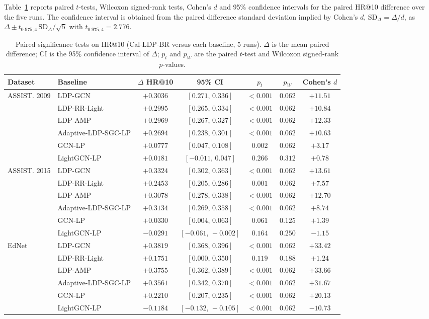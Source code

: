 Table~\ref{tab:sig} reports paired $t$-tests, Wilcoxon signed-rank tests, Cohen's $d$ and 95\% confidence intervals for the paired HR@10 difference over the five runs. The confidence interval is obtained from the paired difference standard deviation implied by Cohen's $d$, $\mathrm{SD}_{\Delta}=\Delta/d$, as $\Delta\pm t_{0.975,4}\,\mathrm{SD}_{\Delta}/\sqrt{5}$ with $t_{0.975,4}=2.776$.

\begin{table}[t]
\caption{Paired significance tests on HR@10 (Cal-LDP-BR versus each baseline, 5 runs). $\Delta$ is the mean paired difference; CI is the 95\% confidence interval of $\Delta$; $p_t$ and $p_W$ are the paired $t$-test and Wilcoxon signed-rank $p$-values.}
\label{tab:sig}
\footnotesize
\setlength{\tabcolsep}{3.4pt}
\begin{tabular}{@{}llccccc@{}}
\toprule
Dataset & Baseline & $\Delta$ HR@10 & 95\% CI & $p_t$ & $p_W$ & Cohen's $d$ \\
\midrule
ASSIST. 2009 & LDP-GCN & $+0.3036$ & $[0.271,\,0.336]$ & $<0.001$ & $0.062$ & $+11.51$ \\
 & LDP-RR-Light & $+0.2995$ & $[0.265,\,0.334]$ & $<0.001$ & $0.062$ & $+10.84$ \\
 & LDP-AMP & $+0.2969$ & $[0.267,\,0.327]$ & $<0.001$ & $0.062$ & $+12.33$ \\
 & Adaptive-LDP-SGC-LP & $+0.2694$ & $[0.238,\,0.301]$ & $<0.001$ & $0.062$ & $+10.63$ \\
 & GCN-LP & $+0.0777$ & $[0.047,\,0.108]$ & $0.002$ & $0.062$ & $+3.17$ \\
 & LightGCN-LP & $+0.0181$ & $[-0.011,\,0.047]$ & $0.266$ & $0.312$ & $+0.78$ \\
ASSIST. 2015 & LDP-GCN & $+0.3324$ & $[0.302,\,0.363]$ & $<0.001$ & $0.062$ & $+13.61$ \\
 & LDP-RR-Light & $+0.2453$ & $[0.205,\,0.286]$ & $0.001$ & $0.062$ & $+7.57$ \\
 & LDP-AMP & $+0.3078$ & $[0.278,\,0.338]$ & $<0.001$ & $0.062$ & $+12.70$ \\
 & Adaptive-LDP-SGC-LP & $+0.3134$ & $[0.269,\,0.358]$ & $<0.001$ & $0.062$ & $+8.74$ \\
 & GCN-LP & $+0.0330$ & $[0.004,\,0.063]$ & $0.061$ & $0.125$ & $+1.39$ \\
 & LightGCN-LP & $-0.0291$ & $[-0.061,\,-0.002]$ & $0.164$ & $0.250$ & $-1.15$ \\
EdNet & LDP-GCN & $+0.3819$ & $[0.368,\,0.396]$ & $<0.001$ & $0.062$ & $+33.42$ \\
 & LDP-RR-Light & $+0.1751$ & $[0.000,\,0.350]$ & $0.119$ & $0.188$ & $+1.24$ \\
 & LDP-AMP & $+0.3755$ & $[0.362,\,0.389]$ & $<0.001$ & $0.062$ & $+33.66$ \\
 & Adaptive-LDP-SGC-LP & $+0.3561$ & $[0.342,\,0.370]$ & $<0.001$ & $0.062$ & $+31.67$ \\
 & GCN-LP & $+0.2210$ & $[0.207,\,0.235]$ & $<0.001$ & $0.062$ & $+20.13$ \\
 & LightGCN-LP & $-0.1184$ & $[-0.132,\,-0.105]$ & $<0.001$ & $0.062$ & $-10.73$ \\
\bottomrule
\end{tabular}


\end{table}
